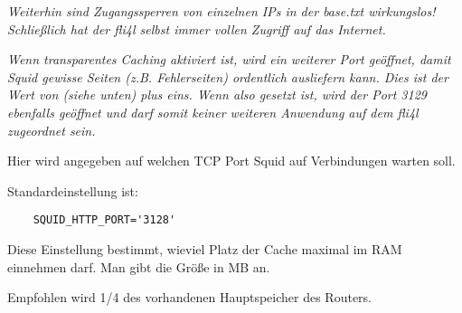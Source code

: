 \begin{description}

                \emph{Weiterhin sind Zugangssperren von einzelnen IPs in der
                                base.txt wirkungslos! Schließlich hat der
                                fli4l selbst immer vollen Zugriff auf das
                                Internet.}

                \emph{Wenn transparentes Caching aktiviert ist, wird ein
                         weiterer Port geöffnet, damit Squid gewisse Seiten
                         (z.B. Fehlerseiten) ordentlich ausliefern kann. Dies
                         ist der Wert von  (siehe unten)
                         plus eins. Wenn also 
                         gesetzt ist, wird der Port 3129 ebenfalls geöffnet und
                         darf somit keiner weiteren Anwendung auf dem fli4l
                         zugeordnet sein.}



                Hier wird angegeben auf welchen TCP Port Squid auf Verbindungen
                warten soll.

                Standardeinstellung ist:
\begin{verbatim}
	SQUID_HTTP_PORT='3128'
\end{verbatim}




                Diese Einstellung bestimmt, wieviel Platz der Cache maximal
                im RAM einnehmen darf. Man gibt die Größe in MB an.

                Empfohlen wird 1/4 des vorhandenen Hauptspeicher des Routers.




\end{description}
